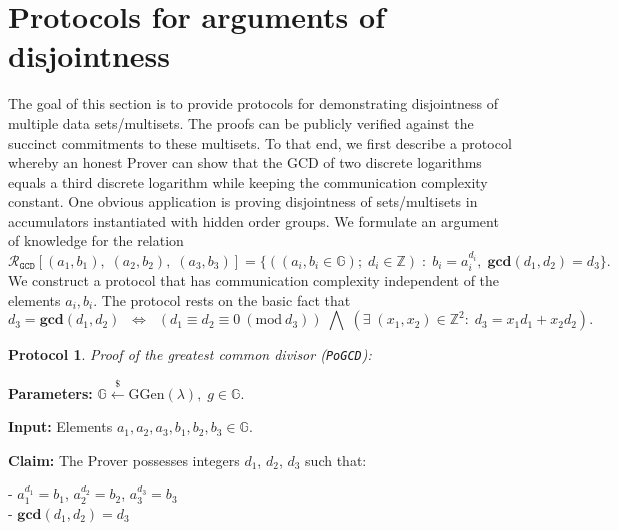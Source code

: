 \documentclass[11pt, lettersize, notitlepage, leqno, footskip=0.6cm]{article}
\newcommand{\bz}{\mathbb Z}
\newcommand{\ttt}{\texttt}
\newcommand{\LRA}{\Longleftrightarrow}
\newcommand{\mc}{\mathcal}
\newcommand{\mb}{\mathbb}
\newcommand{\mbf}{\mathbf}
\newcommand{\mr}{\mathrm}
\newcommand{\lamb}{\lambda}
\newcommand{\vs}{\vspace{-0.15cm}}
\newcommand{\Mod}[1]{\ (\mathrm{mod}\ #1)}
\newcommand{\GCD}{\mbf{gcd}}
\newtheorem{Prot}[Thm]{Protocol}
\numberwithin{equation}{section}
\begin{document}
\section{\fontsize{12}{12}\selectfont Protocols for arguments of disjointness}

The goal of this section is to provide protocols for demonstrating disjointness of multiple data sets/multisets. The proofs can be publicly verified against the succinct commitments to these multisets. To that end, we first describe a protocol whereby an honest Prover can show that the GCD of two discrete logarithms equals a third discrete logarithm while keeping the communication complexity constant. One obvious application is proving disjointness of sets/multisets in accumulators instantiated with hidden order groups. We formulate an argument of knowledge for the relation \vs  $$\mc{R}_{{\ttt{GCD}}}[(a_1,b_1),\;(a_2,b_2),\;(a_3,b_3)] = \{((a_i, b_i\in\mb{G});\;d_i\in\bz)\;:\; b_i = a_i^{d_i},\;\GCD(d_1,d_2)=d_3  \} .$$ We construct a protocol that has communication complexity independent of the elements $a_i, b_i$. The protocol rests on the basic fact that \vs $$d_3 = \GCD(d_1, d_2)\;\; \LRA \;\;(d_1\equiv d_2\equiv 0 \Mod{d_3})\;\bigwedge \; \left(\exists \; (x_1,x_2)\in \bz^2:\; d_3 = x_1d_1+x_2d_2  \right).$$
 

\begin{Prot} \normalfont \hypertarget{GCD}{\textit{Proof of the greatest common divisor}} (\verb|PoGCD|):\end{Prot} \vspace{-0.3cm}

\noindent \textbf{Parameters:} $\mb{G}\xleftarrow{\$} \mr{GGen}(\lamb), \; g\in \mb{G}$.

\noindent \textbf{Input:} Elements $a_1, a_2, a_3, b_1, b_2, b_3 \in \mb{G}$.

\noindent \textbf{Claim:} The Prover possesses integers $d_1$, $d_2$, $d_3$ such that:

\noindent - $a_1^{d_1} = b_1$, $a_2^{d_2} = b_2$, $a_3^{d_3} = b_3$\\
\noindent - $\GCD(d_1, d_2) = d_3$
 
\end{document}
